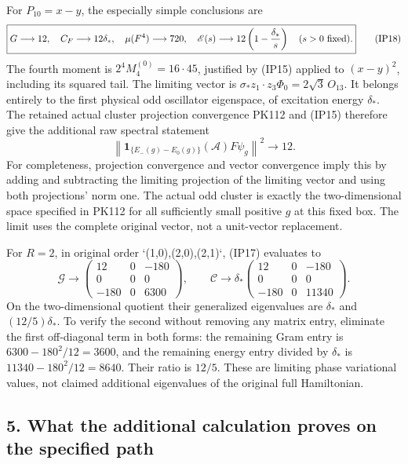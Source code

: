 \documentclass[11pt]{article}
\begin{document}
For \(P_{10}=x-y\), the especially simple conclusions are
\[
\boxed{
 G\longrightarrow12,\quad C_F\longrightarrow12\delta_*,\quad
 \mu(F^4)\longrightarrow720,\quad
 \mathscr E(s)\longrightarrow12\left(1-{\delta_*\over s}\right)
 \quad(s>0\hbox{ fixed}).
}\tag{IP18}
\]
The fourth moment is \(2^4M_4^{(0)}=16\cdot45\), justified by
(IP15) applied to \((x-y)^2\), including its squared tail.
The limiting vector is \(\sigma_*z_1\cdot z_3\Phi_0
=2\sqrt3\,O_{13}\). It belongs entirely to the first physical odd
oscillator eigenspace, of excitation energy \(\delta_*\).
The retained actual cluster projection convergence PK112 and (IP15)
therefore give the additional raw spectral statement
\[
 \left\|\mathbf1_{\{E_-(g)-E_0(g)\}}(\mathcal A)F\psi_g\right\|^2
 \longrightarrow12.\tag{IP19}
\]
For completeness, projection convergence and vector convergence imply
this by adding and subtracting the limiting projection of the limiting
vector and using both projections' norm one. The actual odd cluster
is exactly the two-dimensional space specified in PK112 for all
sufficiently small positive \(g\) at this fixed box. The limit uses the
complete original vector, not a unit-vector replacement.

For \(R=2\), in original order `(1,0),(2,0),(2,1)`, (IP17) evaluates to
\[
 \mathcal G\longrightarrow
 \begin{pmatrix}12&0&-180\\0&0&0\\-180&0&6300\end{pmatrix},\qquad
 \mathcal C\longrightarrow\delta_*
 \begin{pmatrix}12&0&-180\\0&0&0\\-180&0&11340\end{pmatrix}.
 \tag{IP20}
\]
On the two-dimensional quotient their generalized eigenvalues are
\(\delta_*\) and \((12/5)\delta_*\). To verify the second without
removing any matrix entry, eliminate the first off-diagonal term in
both forms: the remaining Gram entry is
\(6300-180^2/12=3600\), and the remaining energy entry divided by
\(\delta_*\) is \(11340-180^2/12=8640\). Their ratio is \(12/5\).
These are limiting phase variational values, not claimed additional
eigenvalues of the original full Hamiltonian.

\subsection*{5. What the additional calculation proves on the specified path}
\end{document}
